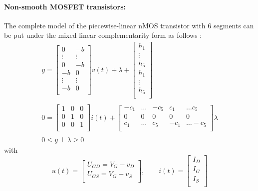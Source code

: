 \documentclass{article}
\def\geq{\geqslant}
\def\leq{\leqslant}
\begin{document}
\paragraph{Non-smooth MOSFET transistors:} The complete model of the piecewise-linear nMOS transistor with 6 segments can be put under the mixed linear complementarity form as follows \cite{leenaerts-bokhoven1998}:
\begin{equation}
  \label{eq:68}
  \begin{array}{l}
  y = 
  \left[\begin{array}{cc}
    0 & -b \\
    \vdots & \vdots  \\
     0 & -b \\
      -b &  0 \\
    \vdots & \vdots \\
     -b &  0 \\
  \end{array}\right]
  v(t)
  +
 \lambda
  +
   \left[\begin{array}{c}
    h_1 \\
    \vdots \\
    h_5 \\
      h_1 \\
    \vdots \\
     h_5 \\
  \end{array}\right] \\ \\ 
 0 =
  \left[\begin{array}{ccc}
    1 & 0 & 0 \\
    0 & 1 & 0 \\
    0 & 0 & 1 \\
  \end{array}\right]
 i(t) 
 + 
 \left[\begin{array}{cccccc}
   -c_1  &\ldots & -c_5 & c_1 &\ldots c_5 \\
   0  & 0& 0 &0  & 0  \\
   c_1  &\ldots & c_5 & -c_1 &\ldots -c_5 \\
 \end{array}\right]
\lambda \\ \\ 0 \leq y \perp \lambda \geq 0
\end{array}
\end{equation}
  with
\begin{equation}
  \label{eq:69}
  u(t) = 
  \left[\begin{array}{c}
    U_{GD}=V_G-v_D \\
    U_{GS}=V_G-v_S \\ 
  \end{array}\right],\quad\quad
i(t) = 
  \left[\begin{array}{c}
   I_D \\
   I_G \\
   I_S \\
  \end{array}\right]
\end{equation}
\end{document}
